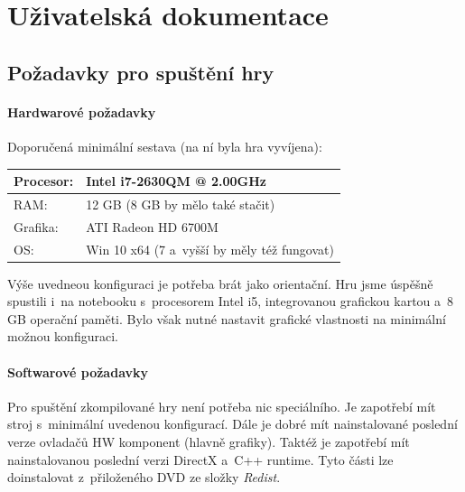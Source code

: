 
\chapter{Uživatelská dokumentace}

\section{Požadavky pro spuštění hry}
\subsubsection{Hardwarové požadavky}

Doporučená minimální sestava (na ní byla hra vyvíjena): 

\begin{center}
	\begin{tabular} { | l | l |}
		\hline
		Procesor: 	&	Intel i7-2630QM @ 2.00GHz \\	\hline
		RAM:		&	12 GB	(8 GB by mělo také stačit) \\	\hline
		Grafika:	&	ATI Radeon HD 6700M \\	\hline
		OS:			&	Win 10 x64	(7 a~vyšší by měly též fungovat) \\
		\hline
	\end{tabular}
\end{center}

Výše uvedneou konfiguraci je potřeba brát jako orientační. Hru jsme úspěšně spustili i~na notebooku s~procesorem Intel i5, integrovanou grafickou kartou a~8 GB operační paměti. Bylo však nutné nastavit grafické vlastnosti na minimální možnou konfiguraci. 

\subsubsection{Softwarové požadavky}

Pro spuštění zkompilované hry není potřeba nic speciálního. Je zapotřebí mít stroj s~minimální uvedenou konfigurací. Dále je dobré mít nainstalované poslední verze ovladačů HW komponent (hlavně grafiky). Taktéž je zapotřebí mít nainstalovanou poslední verzi DirectX a~C++ runtime. Tyto části lze doinstalovat z~přiloženého DVD ze složky \textit{Redist}.


